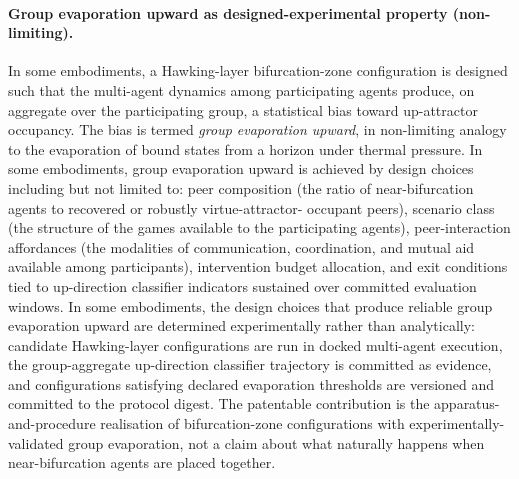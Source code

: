 \documentclass[a4paper,12pt]{article}
\begin{document}
\paragraph{Group evaporation upward as designed-experimental property
(non-limiting).}
In some embodiments, a Hawking-layer bifurcation-zone configuration
is designed such that the multi-agent dynamics among participating
agents produce, on aggregate over the participating group, a
statistical bias toward up-attractor occupancy. The bias is termed
\emph{group evaporation upward}, in non-limiting analogy to the
evaporation of bound states from a horizon under thermal pressure.
In some embodiments, group evaporation upward is achieved by design
choices including but not limited to: peer composition (the ratio of
near-bifurcation agents to recovered or robustly virtue-attractor-
occupant peers), scenario class (the structure of the games
available to the participating agents), peer-interaction affordances
(the modalities of communication, coordination, and mutual aid
available among participants), intervention budget allocation, and
exit conditions tied to up-direction classifier indicators sustained
over committed evaluation windows. In some embodiments, the design
choices that produce reliable group evaporation upward are
determined experimentally rather than analytically: candidate
Hawking-layer configurations are run in docked multi-agent
execution, the group-aggregate up-direction classifier trajectory is
committed as evidence, and configurations satisfying declared
evaporation thresholds are versioned and committed to the protocol
digest. The patentable contribution is the apparatus-and-procedure
realisation of bifurcation-zone configurations with
experimentally-validated group evaporation, not a claim about what
naturally happens when near-bifurcation agents are placed together.
\end{document}
